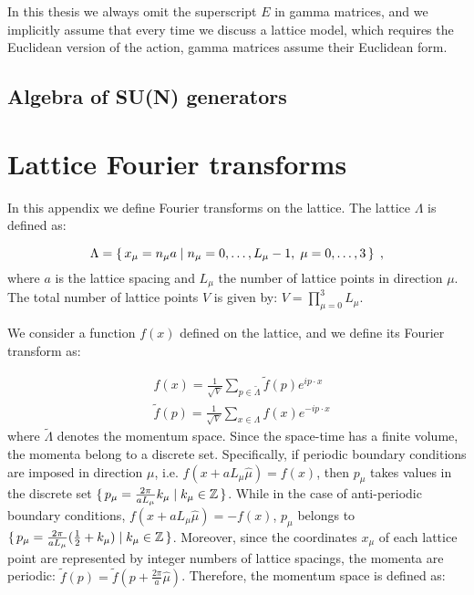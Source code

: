 In this thesis we always omit the superscript $E$ in gamma matrices, and we implicitly assume that every time we discuss a lattice model, which requires the Euclidean version of the action, gamma matrices assume their Euclidean form.

\subsection{Algebra of SU(N) generators}

\section{Lattice Fourier transforms}
\label{Fourier}

In this appendix we define Fourier transforms on the lattice. The lattice $\Lambda$ is defined as: 

\begin{equation}
\Lambda = \set{x_{\mu} = n_{\mu} a  \mid  n_{\mu}  = 0, \dots, L_{\mu} -1, \; \mu = 0, \dots, 3 } \; ,
\end{equation}
%
where $a$ is the lattice spacing and $L_{ \mu}$ the number of lattice points in direction $\mu$. The total number of lattice points $V$ is given by: $V = \prod_{\mu=0}^3 L_{\mu}$.

We consider a function $f(x)$ defined on the lattice, and we define its Fourier transform as:

\begin{equation}
\begin{split}
&f(x) = \frac{1}{\sqrt V} \sum_{p \in \tilde\Lambda} \tilde f(p) e^{i p \cdot x}\\
&\tilde f(p) = \frac{1}{\sqrt V} \sum_{x \in \Lambda}  f(x) e^{-i p \cdot x}
\end{split}
\end{equation}
%
where $\tilde\Lambda$ denotes the momentum space. Since the space-time has a finite volume, the momenta belong to a discrete set. Specifically, if periodic boundary conditions are imposed in direction $\mu$, i.e. $f(x+aL_{\mu} \hat\mu) = f(x)$, then $p_{\mu}$ takes values in the discrete set $\set{p_{\mu} = \frac{2\pi}{a L_{\mu}} k_{\mu} \mid k_{\mu} \in \mathbb{Z}}$. While in the case of anti-periodic boundary conditions, $f(x+aL_{\mu} \hat\mu) = -f(x)$, $p_{\mu}$ belongs to $\set{p_{\mu} = \frac{2\pi}{a L_{\mu}} (\frac{1}{2} + k_{\mu}) \mid k_{\mu} \in \mathbb{Z}}$. Moreover, since the coordinates $x_{\mu}$ of each lattice point are represented by integer numbers of lattice spacings, the momenta are periodic: $\tilde f(p) = \tilde f(p + \frac{2\pi}{a}\hat\mu)$. Therefore, the momentum space is defined as:

